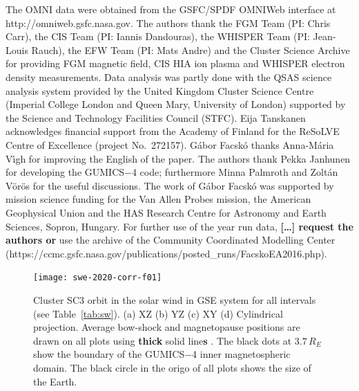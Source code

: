 \documentclass[linenumbers,draft]{agujournal}
\begin{document}
\begin{acknowledgments}
The OMNI data were obtained from the GSFC/SPDF OMNIWeb interface at http://omniweb.gsfc.nasa.gov. The authors thank the FGM Team (PI: Chris Carr), the CIS Team (PI: Iannis Dandouras), the WHISPER Team (PI: Jean-Louis Rauch), the EFW Team (PI: Mats Andre) and the Cluster Science Archive for providing FGM magnetic field, CIS HIA ion plasma and WHISPER electron density measurements. Data analysis was partly done with the QSAS science analysis system provided by the United Kingdom Cluster Science Centre (Imperial College London and Queen Mary, University of London) supported by the Science and Technology Facilities Council (STFC). Eija Tanskanen acknowledges financial support from the Academy of Finland for the ReSoLVE Centre of Excellence (project No.~272157). G{\'a}bor Facsk{\'o} thanks Anna-M\'aria V\'\i gh for improving the English of the paper. The authors thank Pekka Janhunen for developing the GUMICS$-$4 code; furthermore Minna Palmroth and Zolt{\'a}n V{\"o}r{\"o}s for the useful discussions. The work of G{\'a}bor Facsk{\'o} was supported by mission science funding for the Van Allen Probes mission, the American Geophysical Union and the HAS Research Centre for Astronomy and Earth Sciences, Sopron, Hungary. For further use of the year run data, \textbf{[\dots] request the authors or} use the archive of the Community Coordinated Modelling Center (https://ccmc.gsfc.nasa.gov/publications/posted\_runs/FacskoEA2016.php).
\end{acknowledgments}






\pagebreak

\begin{figure}[h]
\centering
\texttt{[image: swe-2020-corr-f01]}  
\caption{Cluster SC3 orbit in the solar wind in GSE system for all intervals  (see Table~\ref{tab:sw}). (a) XZ (b) YZ (c) XY (d) Cylindrical projection. Average bow-shock and magnetopause positions are drawn on all plots using \textbf{thick} solid line\textbf{s} \citep[][respectively]{peredo95:_three_alfven_mach,tsyganenko95:_model_earth}. The black dots at $3.7\,R_E$ show the boundary of the GUMICS$-$4 inner magnetospheric domain. The black circle in the origo of all plots shows the size of the Earth.}
\label{fig:sworbit}
\end{figure}

\pagebreak
\end{document}
